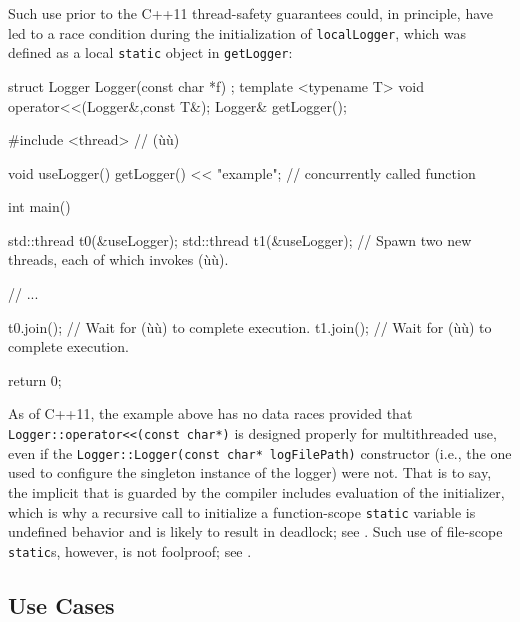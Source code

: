 Such use prior to the C++11 thread-safety guarantees could, in
principle, have led to a race condition during the initialization of
\lstinline!localLogger!, which was defined as a local \lstinline!static!
object in \lstinline!getLogger!:

\begin{emcppshiddenlisting}[emcppsbatch={e6,e15}]
struct Logger {
  Logger(const char *f) {}
};
template <typename T>
void operator<<(Logger&,const T&);
Logger& getLogger();
\end{emcppshiddenlisting}
\begin{emcppslisting}[emcppsbatch=e6]
#include <thread>  // (ù{}ù)

void useLogger() { getLogger() << "example"; }  // concurrently called function

int main()
{
    std::thread t0(&useLogger);
    std::thread t1(&useLogger);
        // Spawn two new threads, each of which invokes (ù{}ù).

    // ...

    t0.join();  // Wait for (ù{}ù) to complete execution.
    t1.join();  // Wait for (ù{}ù) to complete execution.

    return 0;
}
\end{emcppslisting}

\noindent As of C++11, the example above has no data races provided that \linebreak%
\lstinline!Logger::operator<<(const!~\lstinline!char*)! is designed properly
for multithreaded use, even if the
\lstinline!Logger::Logger(const!~\lstinline!char*!~\lstinline!logFilePath)!
constructor (i.e., the one used to configure the singleton instance of
the logger) were not. That is to say, the implicit  that is guarded by the compiler includes evaluation of the
initializer, which is why a recursive call to initialize a
function-scope \lstinline!static! variable is undefined behavior and is
likely to result in deadlock; see .
Such use of file-scope \lstinline!static!s, however, is not foolproof; see .

\subsection[Use Cases]{Use Cases}\label{use-cases-functionstatic}


